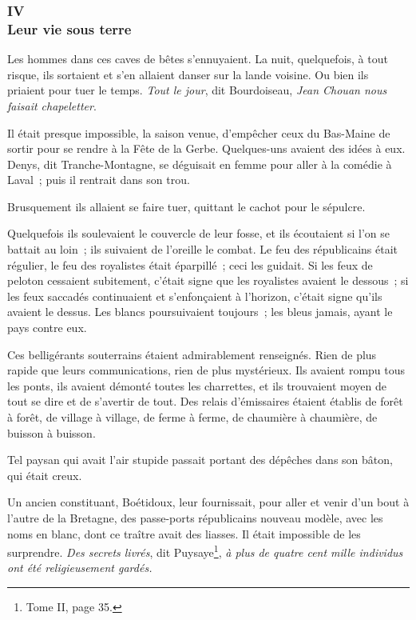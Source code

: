 \documentclass[french,twoside]{book} %
\begin{document}
 \subsubsection[{IV. Leur vie sous terre}]{IV \\
Leur vie sous terre}
\label{p3l1c4}
\noindent Les hommes dans ces caves de bêtes s’ennuyaient. La nuit, quelquefois, à tout risque, ils sortaient et s’en allaient danser sur la lande voisine. Ou bien ils priaient pour tuer le temps. \emph{Tout le jour}, dit Bourdoiseau, \emph{Jean Chouan nous faisait chapeletter}.\par
Il était presque impossible, la saison venue, d’empêcher ceux du Bas-Maine de sortir pour se rendre à la Fête de la Gerbe. Quelques-uns avaient des idées à eux. Denys, dit Tranche-Montagne, se déguisait en femme pour aller à la comédie à Laval ; puis il rentrait dans son trou.\par
Brusquement ils allaient se faire tuer, quittant le cachot pour le sépulcre.\par
Quelquefois ils soulevaient le couvercle de leur fosse, et ils écoutaient si l’on se battait au loin ; ils suivaient de l’oreille le combat. Le feu des républicains était régulier, le feu des royalistes était éparpillé ; ceci les guidait. Si les feux de peloton cessaient subitement, c’était signe que les royalistes avaient le dessous ; si les feux saccadés continuaient et s’enfonçaient à l’horizon, c’était signe qu’ils avaient le dessus.  Les blancs poursuivaient toujours ; les bleus jamais, ayant le pays contre eux.\par
Ces belligérants souterrains étaient admirablement renseignés. Rien de plus rapide que leurs communications, rien de plus mystérieux. Ils avaient rompu tous les ponts, ils avaient démonté toutes les charrettes, et ils trouvaient moyen de tout se dire et de s’avertir de tout. Des relais d’émissaires étaient établis de forêt à forêt, de village à village, de ferme à ferme, de chaumière à chaumière, de buisson à buisson.\par
Tel paysan qui avait l’air stupide passait portant des dépêches dans son bâton, qui était creux.\par
Un ancien constituant, Boétidoux, leur fournissait, pour aller et venir d’un bout à l’autre de la Bretagne, des passe-ports républicains nouveau modèle, avec les noms en blanc, dont ce traître avait des liasses. Il était impossible de les surprendre. \emph{Des secrets livrés}, dit Puysaye\footnote{ \noindent Tome II, page 35.
 }, \emph{à plus de quatre cent mille individus ont été religieusement gardés.}\par
\end{document}
